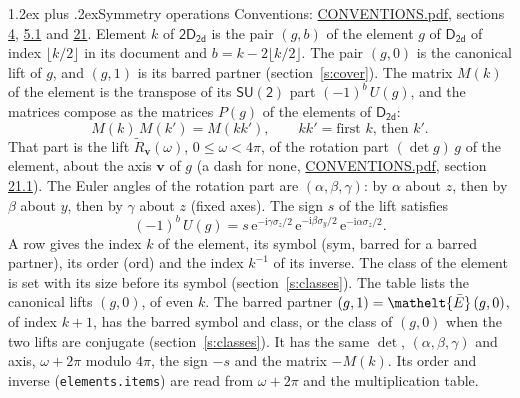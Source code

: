 \documentclass[10pt,a4paper]{article}
\makeatletter
\renewcommand\section{\@startsection{section}{1}{\z@}{-3ex plus -1ex minus -.2ex}%
  {1.2ex plus .2ex}{\normalfont\large\sffamily\bfseries\color{parttitle}}}
\numberwithin{equation}{section}
\newcommand{\eltfont}[1]{{\let\sigma\eltsigma\mathelt{#1}}}
\newcommand{\grp}[1]{\mathsf{#1}}
\newcommand{\elt}[1]{\eltfont{#1}}
\newcommand{\vv}{\mathbf{v}}
\newcommand{\iunit}{\mathrm{i}}
\newcommand{\expe}{\mathrm{e}}
\newcommand{\barred}[1]{\bar{#1}}
\newcommand{\lift}[1]{\tilde{#1}}
\newcommand{\pauli}[1]{\sigma_{#1}}
\makeatother
\begin{document}
\section{Symmetry operations}\label{s:elements}
Conventions: \href{../../CONVENTIONS.pdf}{CONVENTIONS.pdf}, sections \href{../../../rotation/CONVENTIONS.pdf\#conv.4}{4}, \href{../../../rotation/CONVENTIONS.pdf\#conv.5.1}{5.1} and \href{../../CONVENTIONS.pdf\#conv.21}{21}.
\leavevmode\label{n:index.element}\label{n:element.g}Element $k$ of $\grp{2D_{2d}}$ is the pair $(g, b)$ of the element $g$ of \href{../../../rotation/data/pdf/D2d.pdf}{$\grp{D_{2d}}$} of index $\lfloor k/2\rfloor$ in its document and $b = k - 2\lfloor k/2\rfloor$. The pair $(g, 0)$ is the canonical lift of $g$, and $(g, 1)$ is its barred partner (section~\ref{s:cover}). \label{n:matrix.element.pin}\label{n:matrix.element}The matrix $M(k)$ of the element is the transpose of its $\grp{SU(2)}$ part $(-1)^{b}\,U(g)$, and the matrices compose as the matrices $P(g)$ of the elements of $\grp{D_{2d}}$:
\begin{equation}\label{e:mprod}M(k)\,M(k') = M(kk'),\qquad kk' = \text{first } k\text{, then } k'.\end{equation}
\leavevmode\label{n:angle.omega}\label{n:vector.axis}\label{n:vector.pole}That part is the lift $\lift{R}_{\vv}(\omega)$, $0 \le \omega < 4\pi$, of the rotation part $(\det g)\,g$ of the element, about the axis $\vv$ of $g$ (a dash for none, \href{../../CONVENTIONS.pdf}{CONVENTIONS.pdf}, section \href{../../CONVENTIONS.pdf\#conv.21.1}{21.1}). \label{n:angle.euler.alpha}\label{n:angle.euler.beta}\label{n:angle.euler.gamma}\label{n:vector.coordinates}The Euler angles of the rotation part are $(\alpha,\beta,\gamma)$: by $\alpha$ about $z$, then by $\beta$ about $y$, then by $\gamma$ about $z$ (fixed axes). \label{n:local.euler.sign}The sign $s$ of the lift satisfies
\begin{equation}\label{e:euler}(-1)^{b}\,U(g) = s\,\expe^{-\iunit\gamma\pauli{z}/2}\,\expe^{-\iunit\beta\pauli{y}/2}\,\expe^{-\iunit\alpha\pauli{z}/2}.\end{equation}
\leavevmode\label{n:index.element.inverse}\label{n:head.sym}\label{n:head.ord}A row gives the index $k$ of the element, its symbol (sym, barred for a barred partner), its order (ord) and the index $k^{-1}$ of its inverse. \label{n:head.class}The class of the element is set with its size before its symbol (section~\ref{s:classes}).
The table lists the canonical lifts $(g, 0)$, of even $k$. The barred partner $(g, 1) = \elt{\barred{E}}\,(g, 0)$, of index $k + 1$, has the barred symbol and class, or the class of $(g, 0)$ when the two lifts are conjugate (section~\ref{s:classes}). It has the same $\det$, $(\alpha,\beta,\gamma)$ and axis, $\omega + 2\pi$ modulo $4\pi$, the sign $-s$ and the matrix $-M(k)$. Its order and inverse (\texttt{elements.items}) are read from $\omega + 2\pi$ and the multiplication table.
\end{document}
